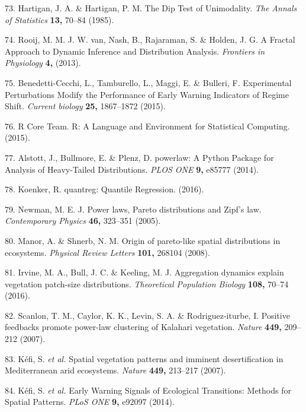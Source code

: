 \documentclass[]{article}
\begin{document}
\hypertarget{ref-Hartigan1985}{}
73. Hartigan, J. A. \& Hartigan, P. M. The Dip Test of Unimodality.
\emph{The Annals of Statistics} \textbf{13,} 70--84 (1985).

\hypertarget{ref-VanRooij2013}{}
74. Rooij, M. M. J. W. van, Nash, B., Rajaraman, S. \& Holden, J. G. A
Fractal Approach to Dynamic Inference and Distribution Analysis.
\emph{Frontiers in Physiology} \textbf{4,} (2013).

\hypertarget{ref-Benedetti-Cecchi2015}{}
75. Benedetti-Cecchi, L., Tamburello, L., Maggi, E. \& Bulleri, F.
Experimental Perturbations Modify the Performance of Early Warning
Indicators of Regime Shift. \emph{Current biology} \textbf{25,}
1867--1872 (2015).

\hypertarget{ref-RCoreTeam2015}{}
76. R Core Team. R: A Language and Environment for Statistical
Computing. (2015).

\hypertarget{ref-Alstott2014}{}
77. Alstott, J., Bullmore, E. \& Plenz, D. powerlaw: A Python Package
for Analysis of Heavy-Tailed Distributions. \emph{PLOS ONE} \textbf{9,}
e85777 (2014).

\hypertarget{ref-Koenker2016}{}
78. Koenker, R. quantreg: Quantile Regression. (2016).

\hypertarget{ref-Newman2005}{}
79. Newman, M. E. J. Power laws, Pareto distributions and Zipf's law.
\emph{Contemporary Physics} \textbf{46,} 323--351 (2005).

\hypertarget{ref-Manor2008a}{}
80. Manor, A. \& Shnerb, N. M. Origin of pareto-like spatial
distributions in ecosystems. \emph{Physical Review Letters}
\textbf{101,} 268104 (2008).

\hypertarget{ref-Irvine2016}{}
81. Irvine, M. A., Bull, J. C. \& Keeling, M. J. Aggregation dynamics
explain vegetation patch-size distributions. \emph{Theoretical
Population Biology} \textbf{108,} 70--74 (2016).

\hypertarget{ref-Scanlon2007}{}
82. Scanlon, T. M., Caylor, K. K., Levin, S. A. \& Rodriguez-iturbe, I.
Positive feedbacks promote power-law clustering of Kalahari vegetation.
\emph{Nature} \textbf{449,} 209--212 (2007).

\hypertarget{ref-Kefi2007b}{}
83. Kéfi, S. \emph{et al.} Spatial vegetation patterns and imminent
desertification in Mediterranean arid ecosystems. \emph{Nature}
\textbf{449,} 213--217 (2007).

\hypertarget{ref-Kefi2014}{}
84. Kéfi, S. \emph{et al.} Early Warning Signals of Ecological
Transitions: Methods for Spatial Patterns. \emph{PLoS ONE} \textbf{9,}
e92097 (2014).
\end{document}
